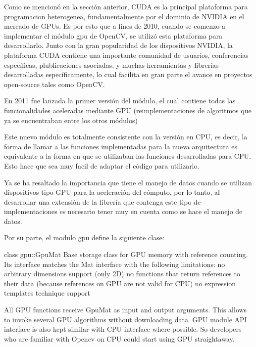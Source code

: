\documentclass[a4paper,10pt]{report}
\begin{document}

Como se mencionó en la sección anterior, CUDA es la principal plataforma para programacion heterogenea, fundamentalmente por el dominio de NVIDIA en el mercado de GPUs.
Es por esto que a fines de 2010, cuando se comenzo a implementar el módulo gpu de OpenCV, se utilizó esta plataforma para desarrollarlo. Junto con la gran popularidad de los dispositivos NVIDIA, 
la plataforma CUDA contiene una importante comunidad de usuarios, conferencias específicas, plublicaciones asociadas, y muchas herramientas y librerías desarrolladas específicamente, lo cual facilita en gran parte el avance en proyectos open-source tales como OpenCV.

En 2011 fue lanzada la primer versión del módulo, el cual contiene todas las funcionalidades aceleradas mediante GPU (reimplementaciones de algoritmos que ya se encuentraban entre los otros módulos) 

Este nuevo módulo es totalmente consistente con la versión en CPU, es decir, la forma de llamar a las funciones implementadas para la nueva arquitectura es equivalente a la forma en que se utilizaban las funciones desarrolladas para CPU.
Esto hace que sea muy facil de adaptar el código para utilizarlo.


Ya se ha resaltado la importancia que tiene el manejo de datos cuando se utilizan dispositivos tipo GPU para la aceleración del cómputo, por lo tanto, al desarrollar una extensión de la librería que contenga este tipo de implementaciones es necesario tener muy en cuenta como se hace el manejo de datos.



Por su parte, el modulo gpu define la siguiente clase:

class gpu::GpuMat
Base storage class for GPU memory with reference counting. Its interface matches the Mat interface with the following limitations:
no arbitrary dimensions support (only 2D)
no functions that return references to their data (because references on GPU are not valid for CPU)
no expression templates technique support

All GPU functions receive GpuMat as input and output arguments. This allows to invoke several GPU algorithms without downloading data. GPU module API interface is also kept similar with CPU interface where possible. So developers who are familiar with Opencv on CPU could start using GPU straightaway.
\end{document}
